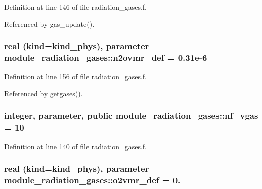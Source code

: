 Definition at line 146 of file radiation\+\_\+gases.\+f.



Referenced by gas\+\_\+update().

\subsubsection[{\texorpdfstring{n2ovmr\+\_\+def}{n2ovmr_def}}]{\setlength{\rightskip}{0pt plus 5cm}real (kind=kind\+\_\+phys), parameter module\+\_\+radiation\+\_\+gases\+::n2ovmr\+\_\+def = 0.\+31e-\/6\hspace{0.3cm}{\ttfamily [private]}}\hypertarget{group__module__radiation__gases_ga858ad802efe755f8b4b5bde85996b6ae}{}\label{group__module__radiation__gases_ga858ad802efe755f8b4b5bde85996b6ae}


Definition at line 156 of file radiation\+\_\+gases.\+f.



Referenced by getgases().

\subsubsection[{\texorpdfstring{nf\+\_\+vgas}{nf_vgas}}]{\setlength{\rightskip}{0pt plus 5cm}integer, parameter, public module\+\_\+radiation\+\_\+gases\+::nf\+\_\+vgas = 10}\hypertarget{group__module__radiation__gases_gaffc350828412da77ff3cf3e617ddc66c}{}\label{group__module__radiation__gases_gaffc350828412da77ff3cf3e617ddc66c}


Definition at line 140 of file radiation\+\_\+gases.\+f.

\subsubsection[{\texorpdfstring{o2vmr\+\_\+def}{o2vmr_def}}]{\setlength{\rightskip}{0pt plus 5cm}real (kind=kind\+\_\+phys), parameter module\+\_\+radiation\+\_\+gases\+::o2vmr\+\_\+def = 0.\hspace{0.3cm}{\ttfamily [private]}}\hypertarget{group__module__radiation__gases_ga910898e96b8afe92ebc82ce62ba682d8}{}\label{group__module__radiation__gases_ga910898e96b8afe92ebc82ce62ba682d8}



